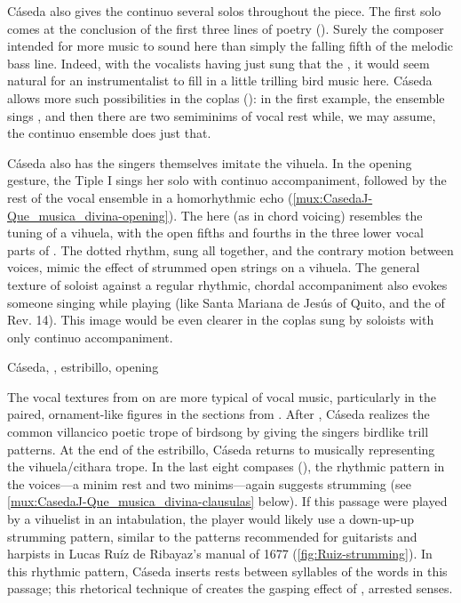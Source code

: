 Cáseda also gives the continuo several solos throughout the piece.
The first solo comes at the conclusion of the first three lines of poetry
().
Surely the composer intended for more music to sound here than simply the
falling fifth of the melodic bass line.
Indeed, with the vocalists having just sung that the , it would seem natural for an instrumentalist
to fill in a little trilling bird music here.
Cáseda allows more such possibilities in the coplas (): in the first example, the ensemble sings , and then there are two semiminims of vocal rest while, we may
assume, the continuo ensemble does just that.

Cáseda also has the singers themselves imitate the vihuela.
In the opening gesture, the Tiple I sings her solo with continuo accompaniment,
followed by the rest of the vocal ensemble in a homorhythmic echo
(\cref{mux:CasedaJ-Que_musica_divina-opening}).
The  here (as in chord voicing) resembles the tuning of a
vihuela, with the open fifths and fourths in the three lower vocal parts of
.
The dotted rhythm, sung all together, and the contrary motion between voices,
mimic the effect of strummed open strings on a vihuela.
The general texture of soloist against a regular rhythmic, chordal
accompaniment also evokes someone singing while playing (like Santa Mariana de
Jesús of Quito, and the  of Rev. 14).
This image would be even clearer in the coplas sung by soloists with only
continuo accompaniment.

{Cáseda, , estribillo, opening}


The vocal textures from  on are more typical of vocal music,
particularly in the paired, ornament-like figures in the sections from
.
After , Cáseda realizes the common villancico poetic trope of
birdsong by giving the singers birdlike trill patterns. 
At the end of the estribillo, Cáseda returns to musically representing the
vihuela/cithara trope.
In the last eight compases (), the rhythmic pattern in the
voices---a minim rest and two minims---again suggests strumming (see
\cref{mux:CasedaJ-Que_musica_divina-clausulas} below).
If this passage were played by a vihuelist in an intabulation, the player would
likely use a down-up-up strumming pattern, similar to the patterns recommended
for guitarists and harpists in Lucas Ruíz de Ribayaz's manual  of 1677 (\cref{fig:Ruiz-strumming}).%
    \Autocite[9]{Ruiz:Luz}
In this rhythmic pattern, Cáseda inserts rests between syllables of the words
in this passage; this rhetorical technique of  creates the
gasping effect of , arrested senses.

